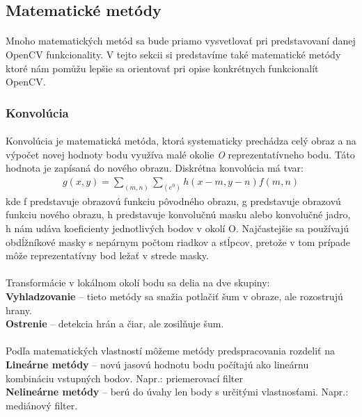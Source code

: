 \documentclass[12pt]{article}
\begin{document}
\subsection{Matematické metódy}
\paragraph{}
Mnoho matematických metód sa bude priamo vysvetlovať pri predstavovaní danej OpenCV funkcionality.
V tejto sekcii si predstavíme také matematické metódy ktoré nám pomůžu lepšie sa orientovať pri opise konkrétnych funkcionalít OpenCV.
\subsubsection{Konvolúcia}
\paragraph{}
Konvolúcia je matematická metóda, ktorá systematicky prechádza celý obraz a na výpočet novej hodnoty bodu využíva malé okolie \emph{O} reprezentatívneho bodu. 
Táto hodnota je zapísaná do nového obrazu. Diskrétna konvolúcia má tvar:
\begin{align*}
g(x,y) = \sum_{(m,n)} \sum_{(e^0)} h(x - m,y - n)f(m,n)
\end{align*}
kde f predstavuje obrazovú funkciu pôvodného obrazu, g predstavuje obrazovú funkciu nového obrazu, h predstavuje konvolučnú masku alebo konvolučné jadro, h nám udáva koeficienty jednotlivých bodov v okolí O.
Najčastejšie sa používajú  obdĺžníkové masky s nepárnym počtom riadkov a stĺpcov, pretože v tom prípade môže reprezentatívny bod ležať v strede masky.
\paragraph{}
Transformácie v lokálnom okolí bodu sa delia na dve skupiny: \\
\textbf{Vyhladzovanie} – tieto metódy sa snažia potlačiť šum v obraze, ale rozostrujú hrany. \\
\textbf{Ostrenie} – detekcia hrán a čiar, ale zosilňuje šum. \\
\paragraph{}
Podľa matematických vlastností môžeme metódy predspracovania rozdeliť na \\
\textbf{Lineárne metódy} – novú jasovú hodnotu bodu počítajú ako lineárnu kombináciu vstupných bodov. Napr.: priemerovací filter \\
\textbf{Nelineárne metódy} – berú do úvahy len body s určitými vlastnosťami. Napr.: mediánový filter.
\cite{DIP}
\end{document}
